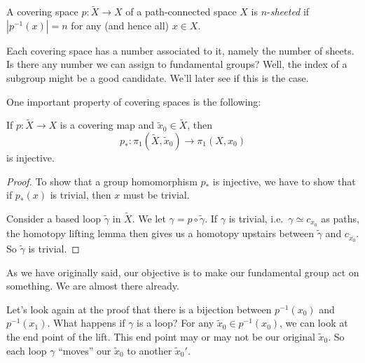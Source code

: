 \documentclass[a4paper]{article}
\begin{document}
\begin{defi}[$n$-sheeted]
  A covering space $p: \tilde{X} \to X$ of a path-connected space $X$ is $n$-\emph{sheeted} if $|p^{-1}(x)| = n$ for any (and hence all) $x \in X$.
\end{defi}
Each covering space has a number associated to it, namely the number of sheets. Is there any number we can assign to fundamental groups? Well, the index of a subgroup might be a good candidate. We'll later see if this is the case.

One important property of covering spaces is the following:
\begin{lemma}
  If $p: \tilde{X} \to X$ is a covering map and $\tilde{x}_0 \in \tilde{X}$, then
  \[
    p_*: \pi_1(\tilde{X}, \tilde{x}_0) \to \pi_1(X, x_0)
  \]
  is injective.
\end{lemma}

\begin{proof}
  To show that a group homomorphism $p_*$ is injective, we have to show that if $p_*(x)$ is trivial, then $x$ must be trivial.

  Consider a based loop $\tilde{\gamma}$ in $\tilde{X}$. We let $\gamma = p\circ \tilde{\gamma}$. If $\gamma$ is trivial, i.e.\ $\gamma \simeq c_{x_0}$ as paths, the homotopy lifting lemma then gives us a homotopy upstairs between $\tilde{\gamma}$ and $c_{\tilde{x}_0}$. So $\tilde{\gamma}$ is trivial.
\end{proof}

As we have originally said, our objective is to make our fundamental group act on something. We are almost there already.

Let's look again at the proof that there is a bijection between $p^{-1}(x_0)$ and $p^{-1}(x_1)$. What happens if $\gamma$ is a loop? For any $\tilde{x}_0 \in p^{-1}(x_0)$, we can look at the end point of the lift. This end point may or may not be our original $\tilde{x}_0$. So each loop $\gamma$ ``moves'' our $\tilde{x}_0$ to another $\tilde{x}_0'$.
\end{document}
